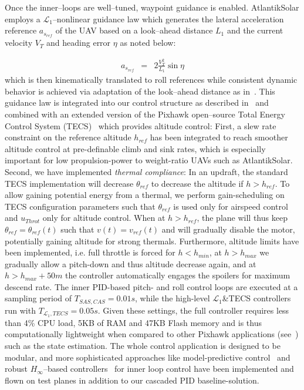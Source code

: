 Once the inner--loops are well--tuned, waypoint guidance is enabled. AtlantikSolar employs a $\mathcal{L}_1$--nonlinear guidance law which generates the lateral acceleration reference $a_{s_{ref}}$ of the UAV based on a look--ahead distance ${L}_1$ and the current velocity $V_T$ and heading error $\eta$ as noted below:

\small
\begin{eqnarray}
 a_{s_{ref}} &=& 2\frac{V_T^2}{L_1}\sin \eta
\end{eqnarray}
\normalsize
which is then kinematically translated to roll references while consistent dynamic behavior is achieved via adaptation of the look--ahead distance as in~\cite{L1stabAnalysis}. This guidance law is integrated into our control structure as described in~\cite{OMLAS_MED_14} and combined with an extended version of the Pixhawk open--source Total Energy Control System (TECS)~\cite{PixhawkWebsite} which provides altitude control: First, a slew rate constraint on the reference altitude $h_{ref}$ has been integrated to reach smoother altitude control at pre-definable climb and sink rates, which is especially important for low propulsion-power to weight-ratio UAVs such as AtlantikSolar. Second, we have implemented \textit{thermal compliance}: In an updraft, the standard TECS implementation will decrease $\theta_{ref}$ to decrease the altitude if $h>h_{ref}$. To allow gaining potential energy from a thermal, we perform gain-scheduling on TECS configuration parameters such that $\theta_{ref}$ is used only for airspeed control and $u_{Throt}$ only for altitude control. When at $h>h_{ref}$, the plane will thus keep $\theta_{ref}=\theta_{ref}(t)$  such that $v(t)=v_{ref}(t)$ and will gradually disable the motor, potentially gaining altitude for strong thermals. Furthermore, altitude limits have been implemented, i.e. full throttle is forced for $h<h_{min}$, at $h>h_{max}$ we gradually allow a pitch-down and thus altitude decrease again, and at $h>h_{max}+50m$ the controller automatically engages the spoilers for maximum descend rate. The inner PID-based pitch- and roll control loops are executed at a sampling period of $T_{SAS,CAS}=0.01s$, while the high-level $\mathcal{L}_1$\&TECS controllers run with $T_{\mathcal{L}_1,TECS}=0.05s$. Given these settings, the full controller requires less than 4\% CPU load, 5KB of RAM and 47KB Flash memory and is thus computationally lightweight when compared to other Pixhawk applications (see~\cite{OMLAS_MED_14}) such as the state estimation. The whole control application is designed to be modular, and more sophisticated approaches like model-predictive control~\cite{OMLAS_MED_14} and robust $H_\infty$--based controllers~\cite{Mosimann_FT} for inner loop control have been implemented and flown on test planes in addition to our cascaded PID baseline-solution. 